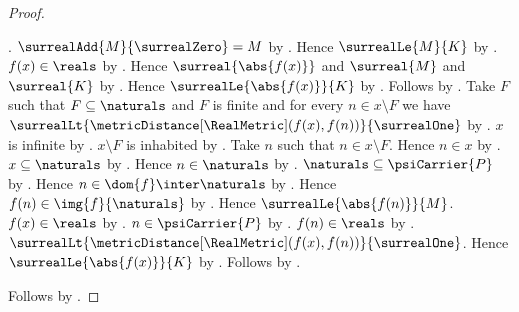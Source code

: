 \begin{proof}
\begin{subproof}
\begin{subproof}
\begin{byCase}
                        .
                    $\surrealAdd{M}{\surrealZero}=M$ by
                        .
                    Hence $\surrealLe{M}{K}$ by \auto.
                    $f(x)\in\reals$ by .
                    Hence $\surreal{\abs{f(x)}}$ and $\surreal{M}$ and
                        $\surreal{K}$ by
                        .
                    Hence $\surrealLe{\abs{f(x)}}{K}$ by
                        .
                    Follows by \auto.
                    Take $F$ such that $F\subseteq\naturals$ and
                        $F$ is finite and for every $n\in x\setminus F$
                        we have
                            $\surrealLt{
                                \metricDistance[\RealMetric](f(x),f(n))}
                                {\surrealOne}$ by
                        .
                    $x$ is infinite by
                        .
                    $x\setminus F$ is inhabited by
                        .
                    Take $n$ such that $n\in x\setminus F$.
                    Hence $n\in x$ by .
                    $x\subseteq\naturals$ by
                        .
                    Hence $n\in\naturals$ by .
                    $\naturals\subseteq\psiCarrier{P}$ by
                        .
                    Hence $n\in\dom{f}\inter\naturals$ by
                        .
                    Hence $f(n)\in\img{f}{\naturals}$ by
                        .
                    Hence $\surrealLe{\abs{f(n)}}{M}$.
                    $f(x)\in\reals$ by .
                    $n\in\psiCarrier{P}$ by .
                    $f(n)\in\reals$ by .
                    $\surrealLt{
                        \metricDistance[\RealMetric](f(x),f(n))}
                        {\surrealOne}$.
                    Hence $\surrealLe{\abs{f(x)}}{K}$ by
                        .
                    Follows by \auto.
            \end{byCase}
        \end{subproof}
    \end{subproof}
    Follows by .
\end{proof}

